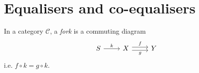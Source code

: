 \documentclass[article, a4paper, 11pt, oneside]{memoir}
\numberwithin{equation}{chapter}
\newcommand{\cat}[1]{\mathcal{#1}}
\newcommand{\catC}{\cat{C}}
\begin{document}


        




\chapter{Equalisers and co-equalisers}

In a category $\catC$, a \emph{fork} is a commuting diagram
%
\begin{equation*}
    \begin{tikzcd}
        S
            \ar[r, "k"]
        & X
            \ar[r, "f", shift left]
            \ar[r, "g", shift right, swap]
        & Y
    \end{tikzcd}
\end{equation*}
%
i.e. $f \circ k = g \circ k$.
\end{document}

